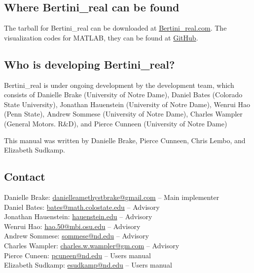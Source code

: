 \subsection{Where Bertini\_real can be found}
		
	The tarball for Bertini\_real can be downloaded at \href{http://www.bertinireal.com/download.html}{Bertini\_real.com}. 
	The visualization codes for MATLAB, they can be found at \href{https://github.com/ofloveandhate/bertini_real/tree/master/matlab_codes}{GitHub}.


	\subsection{Who is developing Bertini\_real?}
	Bertini\_real is under ongoing development by the development team, which consists of Danielle Brake (University of Notre Dame), Daniel Bates (Colorado State University), Jonathan Hauenstein (University of Notre Dame), Wenrui Hao (Penn State), Andrew Sommese (University of Notre Dame), Charles Wampler (General Motors. R\&D), and Pierce Cunneen (University of Notre Dame)

	This manual was written by Danielle Brake, Pierce Cunneen, Chris Lembo, and Elizabeth Sudkamp.


\subsection{Contact}
\label{sec:contact}

Danielle Brake: \href{mailto:danielleamethystbrake@gmail.com}{danielleamethystbrake@gmail.com} -- Main implementer\\
Daniel Bates: \href{mailto:bates@math.colostate.edu}{bates@math.colostate.edu} -- Advisory \\
Jonathan Hauenstein: \href{mailto:hauenstein.edu}{hauenstein.edu} -- Advisory\\
Wenrui Hao: \href{mailto:hao.50@mbi.osu.edu}{hao.50@mbi.osu.edu} -- Advisory\\
Andrew Sommese: \href{mailto:sommese@nd.edu}{sommese@nd.edu} -- Advisory\\
Charles Wampler: \href{mailto:charles.w.wampler@gm.com}{charles.w.wampler@gm.com} -- Advisory\\
Pierce Cuneen: \href{mailto:pcuneen@nd.edu}{pcuneen@nd.edu} -- Users manual \\
Elizabeth Sudkamp: \href{mailto:esudkamp@nd.edu}{esudkamp@nd.edu} -- Users manual

